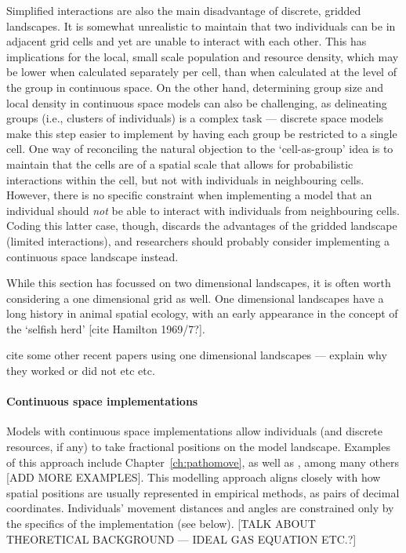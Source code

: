 Simplified interactions are also the main disadvantage of discrete, gridded landscapes.
It is somewhat unrealistic to maintain that two individuals can be in adjacent grid cells and yet are unable to interact with each other.
This has implications for the local, small scale population and resource density, which may be lower when calculated separately per cell, than when calculated at the level of the group in continuous space.
On the other hand, determining group size and local density in continuous space models can also be challenging, as delineating groups (i.e., clusters of individuals) is a complex task --- discrete space models make this step easier to implement by having each group be restricted to a single cell.
One way of reconciling the natural objection to the `cell-as-group' idea is to maintain that the cells are of a spatial scale that allows for probabilistic interactions within the cell, but not with individuals in neighbouring cells.
However, there is no specific constraint when implementing a model that an individual should \emph{not} be able to interact with individuals from neighbouring cells.
Coding this latter case, though, discards the advantages of the gridded landscape (limited interactions), and researchers should probably consider implementing a continuous space landscape instead.

While this section has focussed on two dimensional landscapes, it is often worth considering a one dimensional grid as well.
One dimensional landscapes have a long history in animal spatial ecology, with an early appearance in the concept of the `selfish herd' [cite Hamilton 1969/7?].

cite some other recent papers using one dimensional landscapes --- explain why they worked or did not etc etc.

\paragraph*{Continuous space implementations}

Models with continuous space implementations allow individuals (and discrete resources, if any) to take fractional positions on the model landscape.
Examples of this approach include Chapter~\ref{ch:pathomove}, as well as \citet{spiegel2016,spiegel2017}, among many others [ADD MORE EXAMPLES].
This modelling approach aligns closely with how spatial positions are usually represented in empirical methods, as pairs of decimal coordinates.
Individuals' movement distances and angles are constrained only by the specifics of the implementation (see below).
[TALK ABOUT THEORETICAL BACKGROUND --- IDEAL GAS EQUATION ETC.?]

